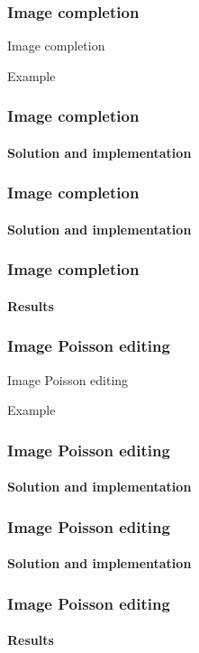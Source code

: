 \documentclass[11pt]{beamer}
\begin{document}
\begin{frame}
\frametitle{Image completion}

\begin{block}{Image completion}

\end{block}

\begin{exampleblock}{Example}
\end{exampleblock}
\end{frame}

\begin{frame}
\frametitle{Image completion}
\framesubtitle{Solution and implementation}

\end{frame}

\begin{frame}
\frametitle{Image completion}
\framesubtitle{Solution and implementation}

\end{frame}

\begin{frame}
\frametitle{Image completion}
\framesubtitle{Results}

\end{frame}


\begin{frame}
\frametitle{Image Poisson editing}

\begin{block}{Image Poisson editing}

\end{block}

\begin{exampleblock}{Example}
\end{exampleblock}
\end{frame}

\begin{frame}
\frametitle{Image Poisson editing}
\framesubtitle{Solution and implementation}

\end{frame}

\begin{frame}
\frametitle{Image Poisson editing}
\framesubtitle{Solution and implementation}

\end{frame}

\begin{frame}
\frametitle{Image Poisson editing}
\framesubtitle{Results}

\end{frame}
\end{document}

